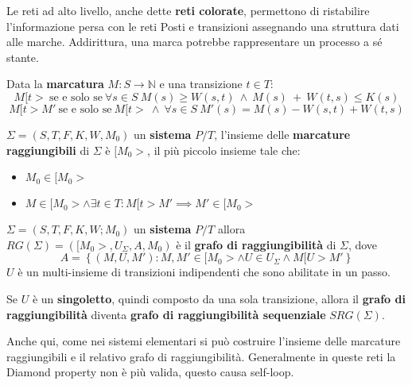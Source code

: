 Le reti ad alto livello, anche dette \textbf{reti colorate}, permettono di
ristabilire l'informazione persa con le reti Posti e transizioni assegnando una
struttura dati alle marche. Addirittura, una marca potrebbe rappresentare un
processo a sé stante.
\begin{definizione}
    Data la \textbf{marcatura} $M:S\to \mathbb{N}$ e una transizione $t\in T$:
    \begin{equation}
        M[t > \ \text{se e solo se} \ \forall s \in S \ M(s) \geq W(s, t) \ \land
        \ M(s) \ + \ W(t, s) \leq K(s)
    \end{equation}
    \begin{equation}
        M[t > M' \ \text{se e solo se} \ M[t > \ \land \ \forall s \in S \ M'(s)
        = M(s) - W(s, t) + W(t, s)
    \end{equation}
\end{definizione}
\begin{definizione}
    $\Sigma = (S,T,F,K,W,M_0)$ un \textbf{sistema} $P/T$, l'insieme delle
    \textbf{marcature raggiungibili} di $\Sigma$ è $[M_0>$, il più piccolo
    insieme tale che:
    \begin{itemize}
        \item $M_0\in [M_0>$
        \item $M\in [M_0>\land \exists t\in T: M[t>M'\implies M' \in [M_0>$
    \end{itemize}
\end{definizione}
\begin{definizione}
    $\Sigma = (S,T,F,K,W;M_0)$ un \textbf{sistema} $P/T$ allora
    $RG(\Sigma)=([M_0>,U_\Sigma,A,M_0)$ è il \textbf{grafo di raggiungibilità}
    di $\Sigma$, dove
    \begin{equation}
        A=\left\{(M,U,M'):M,M'\in [M_0>\land U\in U_\Sigma\land M[U>M' \right\}
    \end{equation}
    $U$ è un multi-insieme di transizioni indipendenti che sono abilitate in un passo.
\end{definizione}
\begin{nota}
    Se $U$ è un \textbf{singoletto}, quindi composto da una sola transizione, allora
    il \textbf{grafo di raggiungibilità} diventa \textbf{grafo di raggiungibilità sequenziale}
    $SRG(\Sigma)$.
\end{nota}
Anche qui, come nei sistemi elementari si può costruire l'insieme delle marcature
raggiungibili e il relativo grafo di raggiungibilità. Generalmente in queste reti
la Diamond property non è più valida, questo causa self-loop.

